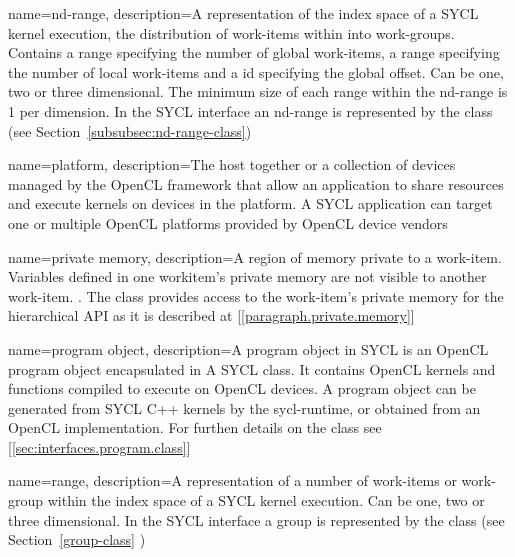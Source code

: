 {
  name={nd-range},
  description={A representation of the index space of a SYCL kernel execution,
  the distribution of \glspl{work-item} within into \glspl{work-group}.
  Contains a \gls{range} specifying the number of global \glspl{work-item}, a
  \gls{range} specifying the number of local \glspl{work-item} and a \gls{id}
  specifying the global offset. Can be one, two or three dimensional. The
  minimum size of each \gls{range} within the \gls{nd-range} is 1 per
  dimension. In the SYCL interface an \gls{nd-range} is represented by the
   class (see Section~\ref{subsubsec:nd-range-class})}
}

{
  name=platform,
  description={The host together or a collection of \glspl{device} managed by the OpenCL
               framework that allow an application to share resources and
               execute kernels on \glspl{device} in the platform. A SYCL application
               can target one or multiple OpenCL platforms provided by
               OpenCL \gls{device} vendors~\cite{opencl12}}
}

{
  name={private memory},
  description={A region of memory private to a work-item. Variables defined in
               one workitem’s private memory are not visible to another
               work-item. \cite{opencl12}.
               The  class provides access to
               the work-item's private memory for the hierarchical API as it is
               described at [\ref{paragraph.private.memory}]}
}

{
  name={program object},
  description={A program object in SYCL is an OpenCL program object 
               encapsulated in A SYCL class. It contains OpenCL kernels and 
               functions compiled to execute on OpenCL \glspl{device}. A program object
               can be generated from SYCL C++ kernels by the \gls{sycl-runtime}, or 
               obtained from an OpenCL implementation. For furthen details
               on the  class see 
         [\ref{sec:interfaces.program.class}]}
}

{
  name={range},
  description={A representation of a number of \glspl{work-item} or
  \gls{work-group} within the index space of a SYCL kernel execution. Can be
  one, two or three dimensional. In the SYCL interface a \gls{group} is
  represented by the  class (see Section~\ref{group-class}
  )}
}

